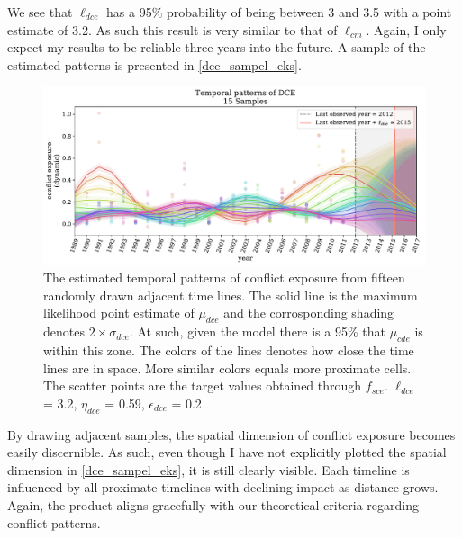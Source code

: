 \documentclass[a4paper]{article}
\begin{document}
We see that $\ell_{dce}$ has a 95\% probability of being between 3 and 3.5 with a point estimate of 3.2. As such this result is very similar to that of $\ell_{cm}$. Again, I only expect my results to be reliable three years into the future. A sample of the estimated patterns is presented in \autoref{dce_sampel_eks}.\par


\begin{figure}[!htb]
	\centering
	\includegraphics[scale=0.47]{dce_15_samples.pdf}
    \caption{\footnotesize{The estimated temporal patterns of conflict exposure from fifteen randomly drawn adjacent time lines. The solid line is the maximum likelihood point estimate of $\mu_{dce}$ and the corrosponding shading denotes $2\times\sigma_{dce}$. At such, given the model there is a 95\% that $\mu_{cde}$ is within this zone. The colors of the lines denotes how close the time lines are in space. More similar colors equals more proximate cells. The scatter points are the target values obtained through $f_{sce}$. $\ell_{dce}$ = 3.2, $\eta_{dce}$ = 0.59, $\epsilon_{dce}$ = 0.2}}\label{dce_sampel_eks}
\end{figure}

By drawing adjacent samples, the spatial dimension of conflict exposure becomes easily discernible. As such, even though I have not explicitly plotted the spatial dimension in \autoref{dce_sampel_eks}, it is still clearly visible. Each timeline is influenced by all proximate timelines with declining impact as distance grows. Again, the product aligns gracefully with our theoretical criteria regarding conflict patterns.\par
\end{document}
